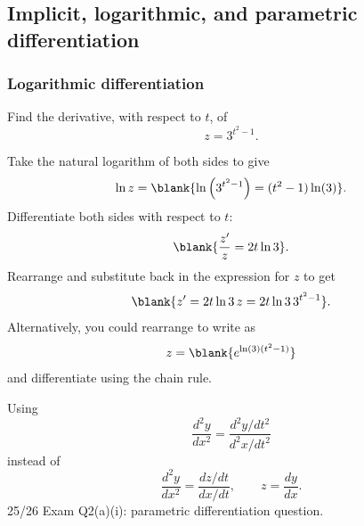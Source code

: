 \subsection{Implicit, logarithmic, and parametric differentiation}
\subsubsection{Logarithmic differentiation}
\begin{example}[Video]
Find the derivative, with respect to $t$, of
\[
z=3^{t^2-1}.
\]
\end{example}
\begin{solution}
Take the natural logarithm of both sides to give
\[
\ln z=\blank{\ln\left(3^{t^2-1}\right)=(t^2-1)\ln(3)}.
\]
Differentiate both sides with respect to $t$:
\[
\blank{\frac{z'}{z}=2t\ln3}.
\]
Rearrange and substitute back in the expression for $z$ to get
\[
\blank{z'=2t\ln3\,z=2t\ln3\,3^{t^2-1}}.
\]
Alternatively, you could rearrange to write as
\[
z=\blank{e^{\ln(3)(t^2-1)}}
\]
and differentiate using the chain rule.
\end{solution}

\begin{exammistake}
Using
\[
\frac{d^2y}{dx^2}=\frac{d^2y/dt^2}{d^2x/dt^2}
\]
instead of
\[
\frac{d^2y}{dx^2}=\frac{dz/dt}{dx/dt},
\qquad z=\frac{dy}{dx}.
\]
25/26 Exam Q2(a)(i): parametric differentiation question.
\end{exammistake}
